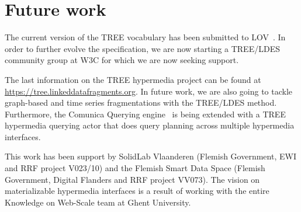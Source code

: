\documentclass[
]{ceurart}
\begin{document}
\section{Future work}

The current version of the TREE vocabulary has been submitted to LOV~\cite{lov}.
In order to further evolve the specification, we are now starting a TREE/LDES community group at W3C for which we are now seeking support.

The last information on the TREE hypermedia project can be found at \url{https://tree.linkeddatafragments.org}.
In future work, we are also going to tackle graph-based and time series fragmentations with the TREE/LDES method.
Furthermore, the Comunica Querying engine~\cite{taelman_iswc_resources_comunica_2018} is being extended with a TREE hypermedia querying actor that does query planning across multiple hypermedia interfaces.

\begin{acknowledgments}

This work has been support by SolidLab Vlaanderen (Flemish Government, EWI and RRF project V023/10) and the Flemish Smart Data Space (Flemish Government, Digital Flanders and RRF project VV073). The vision on materializable hypermedia interfaces is a result of working with the entire Knowledge on Web-Scale team at Ghent University.

  
\end{acknowledgments}


\end{document}
